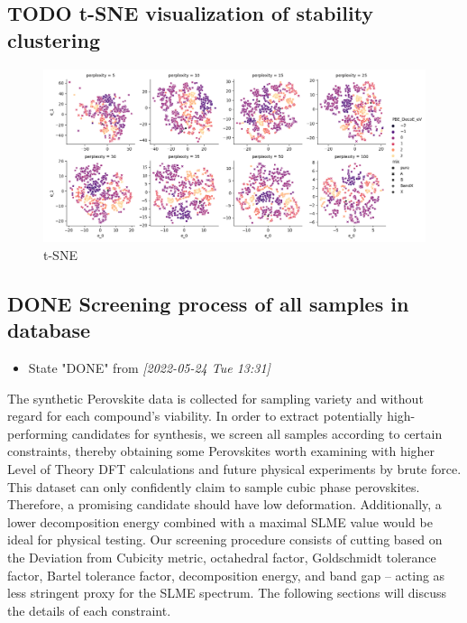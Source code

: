 \documentclass[twoside, twocolumn, 9pt, draft]{article}
\begin{document}
\subsection*{{\bfseries\sffamily TODO} t-SNE visualization of stability clustering}
\label{sec:org74812b0}
\begin{figure}
\centering
\includegraphics[width=.9\linewidth]{tsne_comp_DecoE_clusters.png}
\caption{\label{fig:pca} t-SNE}
\end{figure}

\subsection*{{\bfseries\sffamily DONE} Screening process of all samples in database}
\label{sec:org7de5140}
\begin{itemize}
\item State "DONE"       from              \textit{[2022-05-24 Tue 13:31]}
\end{itemize}
The synthetic Perovskite data is collected for sampling variety and
without regard for each compound's viability. In order to extract
potentially high-performing candidates for synthesis, we screen all
samples according to certain constraints, thereby obtaining some
Perovskites worth examining with higher Level of Theory DFT
calculations and future physical experiments by brute force. This
dataset can only confidently claim to sample cubic phase
perovskites. Therefore, a promising candidate should have low
deformation. Additionally, a lower decomposition energy combined with
a maximal SLME value would be ideal for physical testing. Our
screening procedure consists of cutting based on the Deviation from
Cubicity metric, octahedral factor, Goldschmidt tolerance factor,
Bartel tolerance factor, decomposition energy, and band gap -- acting
as less stringent proxy for the SLME spectrum. The following sections
will discuss the details of each constraint.
\end{document}

